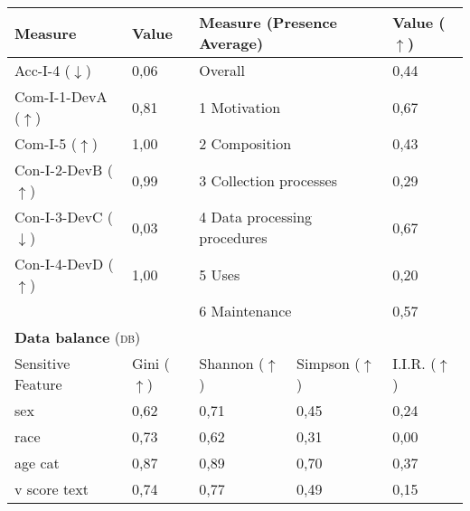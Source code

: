 \begin{table}[h]
\begin{tabular}{|p{3cm}|p{1.9cm}p{3cm}p{2.6cm}p{1.6cm}|}
        Measure & Value & \multicolumn{2}{|l|}{Measure (Presence Average)} & Value ($\uparrow$) \\ \hline
        Acc-I-4 ($\downarrow$) & 0,06\cellcolor[HTML]{FEF8F6} & \multicolumn{2}{|l|}{Overall} & 0,44\cellcolor[HTML]{FDC1AF} \\
        Com-I-1-DevA ($\uparrow$) & 0,81\cellcolor[HTML]{FEEAE4} & \multicolumn{2}{|l|}{1 Motivation} & 0,67\cellcolor[HTML]{FEDAD0} \\
        Com-I-5 ($\uparrow$) & 1,00\cellcolor[HTML]{FFFFFF} & \multicolumn{2}{|l|}{2 Composition} & 0,43\cellcolor[HTML]{FDC0AE} \\
        Con-I-2-DevB ($\uparrow$) & 0,99\cellcolor[HTML]{FEFEFE} & \multicolumn{2}{|l|}{3 Collection processes} & 0,29\cellcolor[HTML]{FCB19A} \\
        Con-I-3-DevC ($\downarrow$) & 0,03\cellcolor[HTML]{FEFBFA} & \multicolumn{2}{|l|}{4 Data processing procedures} & 0,67\cellcolor[HTML]{FEDAD0} \\
        Con-I-4-DevD ($\uparrow$) & 1,00\cellcolor[HTML]{FFFFFF} & \multicolumn{2}{|l|}{5 Uses} & 0,20\cellcolor[HTML]{FCA78E} \\ 
         & & \multicolumn{2}{|l|}{6 Maintenance} & 0,57\cellcolor[HTML]{FDD0C2} \\ \hline
        \multicolumn{5}{|l|}{\textbf{Data balance} (\textsc{db})} \\ \hline 
 		Sensitive Feature & Gini ($\uparrow$) & Shannon ($\uparrow$) & Simpson ($\uparrow$) & I.I.R. ($\uparrow$) \\ \hline
        sex & 0,62 & 0,71 & 0,45 & 0,24 \\
		race & 0,73 & 0,62 & 0,31 & 0,00\cellcolor[HTML]{fc8d59} \\
		age cat & 0,87 & 0,89 & 0,70 & 0,37 \\
		v score text & 0,74 & 0,77 & 0,49 & 0,15 \\
		 \hline
    \end{tabular}
\end{table}